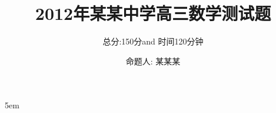 \documentclass[12pt]{ctexart}
\begin{document}
\title{2012年某某中学高三数学测试题}
\author{总分:150分and 时间120分钟}
\date{命题人: 某某某}
\maketitle

\setlength{\parskip} {5em}
\setlength\parindent{2em}

\vspace{1em}

\vspace{2em}

\vspace{2em}
\end{document}
